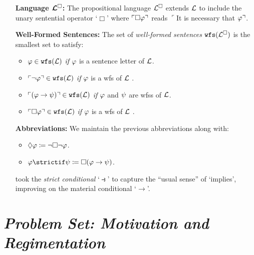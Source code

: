 \documentclass[a4paper, 11pt]{article} %
\begin{document}
\begin{enumerate}[leftmargin=1.2in]
	\item[\bf Language $\boldsymbol{\mathcal{L}^{\square}}$:] The propositional language $\mathcal{L}^{\square}$ extends $\mathcal{L}$ to include the unary sentential operator `$\Box$' where $\ulcorner\Box\varphi\urcorner$ reads $\ulcorner$It is necessary that $\varphi\urcorner$.
	\item[\bf Well-Formed Sentences:] The set of \textit{well-formed sentences} $\texttt{wfs}(\mathcal{L}^{\square})$ is the smallest set to satisfy:
	      \begin{itemize}\small
		      \item $\varphi \in \texttt{wfs}(\mathcal{L})$ \textit{if} $\varphi$ is a sentence letter of $\mathcal{L}$.
		      \item $\ulcorner\neg \varphi\urcorner \in \texttt{wfs}(\mathcal{L})$ \textit{if} $\varphi$ is a wfs of $\mathcal{L}$ .
		      \item $\ulcorner(\varphi \rightarrow \psi)\urcorner \in \texttt{wfs}(\mathcal{L})$ \textit{if} $\varphi$ and $\psi$ are wfss of $\mathcal{L}$.
		      \item $\ulcorner\Box \varphi\urcorner \in \texttt{wfs}(\mathcal{L})$ \textit{if} $\varphi$ is a wfs of $\mathcal{L}$ .
	      \end{itemize}
	\item[\bf Abbreviations:] We maintain the previous abbreviations along with:
	      \begin{itemize}\small
		      \item $\Diamond \varphi \coloneq \neg\Box\neg \varphi$.
		      \item $\metaA \strictif \metaB \coloneq \Box(\metaA \rightarrow \metaB)$.
	      \end{itemize}
	      \citet{Lewis1932} took the \textit{strict conditional} `$\strictif$' to capture the ``usual sense'' of `implies', improving on the material conditional `$\rightarrow$'.
\end{enumerate}



\section*{\it Problem Set: Motivation and Regimentation}
\end{document}
